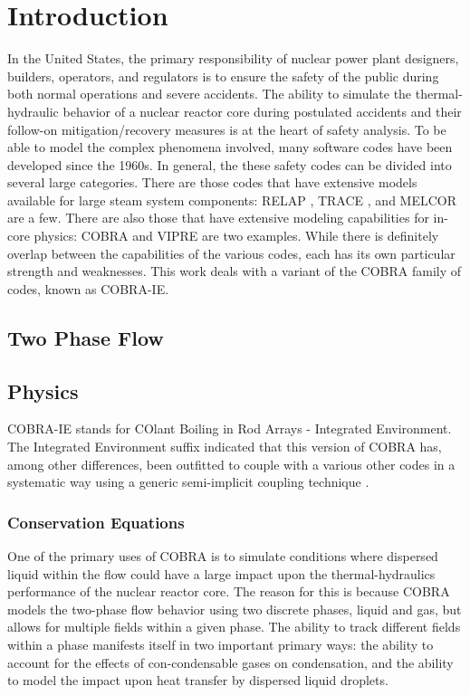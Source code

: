 \chapter{Introduction}
\label{chap:intro}
In the United States, the primary responsibility of nuclear power plant designers, builders, operators, and regulators is to ensure the safety of the public during both normal operations and severe accidents.
The ability to simulate the thermal-hydraulic behavior of a nuclear reactor core during postulated accidents and their follow-on mitigation/recovery measures is at the heart of safety analysis.
To be able to model the complex phenomena involved, many software codes have been developed since the 1960s.
In general, the these safety codes can be divided into several large categories. There are those codes that have extensive models available for large steam system components: RELAP \cite{RELAP}, TRACE \cite{TRACE}, and MELCOR are a few.
There are also those that have extensive modeling capabilities for in-core physics: COBRA \cite{Thurgood1983c} and VIPRE are two examples.
While there is definitely overlap between the capabilities of the various codes, each has its own particular strength and weaknesses.
This work deals with a variant of the COBRA family of codes, known as COBRA-IE.

\section{Two Phase Flow}
\label{sect:two_phase_flow}


\section{Physics}
\label{sect:cobra_physics}
COBRA-IE stands for COlant Boiling in Rod Arrays - Integrated Environment.
The Integrated Environment suffix indicated that this version of COBRA has, among other differences, been outfitted to couple with a various other codes in a systematic way using a generic semi-implicit coupling technique \cite{Weaver2002}.

\subsection{Conservation Equations}
One of the primary uses of COBRA is to simulate conditions where dispersed liquid within the flow could have a large impact upon the thermal-hydraulics performance of the nuclear reactor core.
The reason for this is because COBRA models the two-phase flow behavior using two discrete phases, liquid and gas, but allows for multiple fields within a given phase.
The ability to track different fields within a phase manifests itself in two important primary ways: the ability to account for the effects of con-condensable gases on condensation, and the ability to model the impact upon heat transfer by dispersed liquid droplets.


